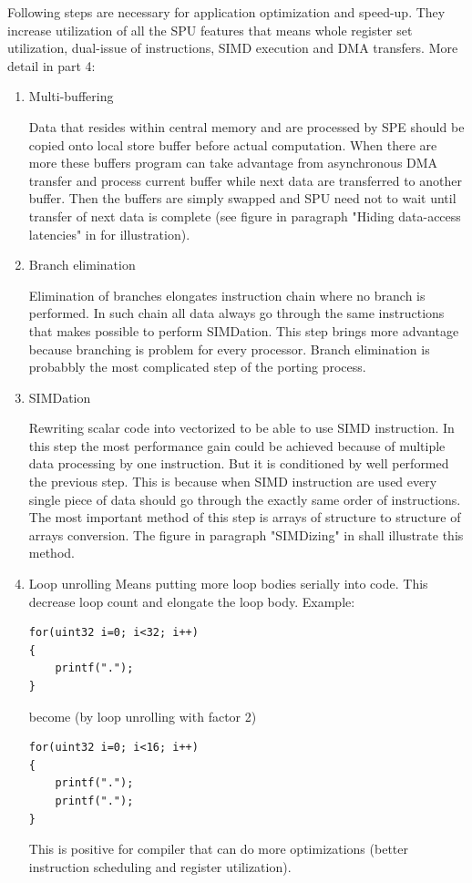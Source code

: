 \par
Following steps are necessary for application optimization and speed-up.
They increase utilization of all the SPU features that means whole register set utilization, dual-issue of instructions, SIMD execution and DMA transfers.
More detail in \cite{writingPerfApps} part 4:
\\
\begin{enumerate}
\item{Multi-buffering}
\par
Data that resides within central memory and are processed by SPE should be copied onto local store buffer before actual computation.
When there are more these buffers program can take advantage from asynchronous DMA transfer and process current buffer while next data are transferred to another buffer.
Then the buffers are simply swapped and SPU need not to wait until transfer of next data is complete (see figure in paragraph "Hiding data-access latencies" in \cite{compilerOptions} for illustration).

\item{Branch elimination}
\par
Elimination of branches elongates instruction chain where no branch is performed.
In such chain all data always go through the same instructions that makes possible to perform SIMDation.
This step brings more advantage because branching is problem for every processor.
Branch elimination is probabbly the most complicated step of the porting process.

\item{SIMDation}
\par
Rewriting scalar code into vectorized to be able to use SIMD instruction.
In this step the most performance gain could be achieved because of multiple data processing by one instruction.
But it is conditioned by well performed the previous step.
This is because when SIMD instruction are used every single piece of data should go through the exactly same order of instructions.
The most important method of this step is arrays of structure to structure of arrays conversion.
The figure in paragraph "SIMDizing" in \cite{compilerOptions} shall illustrate this method.

\item{Loop unrolling}
Means putting more loop bodies serially into code.
This decrease loop count and elongate the loop body.
Example:
\begin{verbatim}
for(uint32 i=0; i<32; i++)
{
    printf(".");
}
\end{verbatim}
become (by loop unrolling with factor 2)
\begin{verbatim}
for(uint32 i=0; i<16; i++)
{
    printf(".");
    printf(".");
}
\end{verbatim}
This is positive for compiler that can do more optimizations (better instruction scheduling and register utilization).


\end{enumerate}
